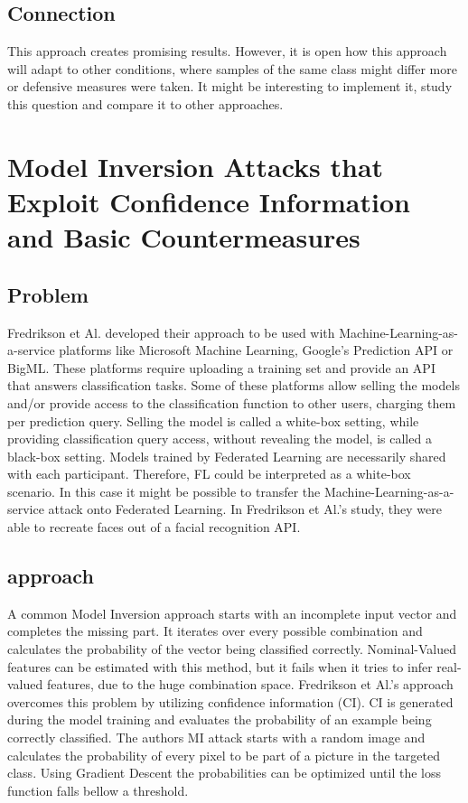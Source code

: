 \documentclass[
	ngerman,
	ruledheaders=section,%
	class=report,%
	thesis={type=bachelor},%
	accentcolor=1b,%
	custommargins=true,%
	marginpar=false,%
	parskip=half-,%
	fontsize=11pt,%
]{tudapub}
\begin{document}
\subsection{Connection}
This approach creates promising results. However, it is open how this approach will adapt to other conditions, where samples of the same class might differ more or defensive measures were taken. It might be interesting to implement it, study this question and compare it to other approaches.





\section{Model Inversion Attacks that Exploit Confidence Information and Basic Countermeasures}
\subsection{Problem}
Fredrikson et Al. \cite{fredrikson2015model} developed their approach to be used with Machine-Learning-as-a-service platforms like Microsoft Machine Learning, Google's Prediction API or BigML. These platforms require uploading a training set and provide an API that answers classification tasks. Some of these platforms allow selling the models and/or provide access to the classification function to other users, charging them per prediction query. Selling the model is called a white-box setting, while providing classification query access, without revealing the model, is called a black-box setting. Models trained by Federated Learning are necessarily shared with each participant. Therefore, FL could be interpreted as a white-box scenario. In this case it might be possible to transfer the Machine-Learning-as-a-service attack onto Federated Learning. In Fredrikson et Al.'s study, they were able to recreate faces out of a facial recognition API.
 
 \subsection{approach}
 A common Model Inversion approach starts with an incomplete input vector and completes the missing part. It iterates over every possible combination and calculates the probability of the vector being classified correctly. Nominal-Valued features can be estimated with this method, but it fails when it tries to infer real-valued features, due to the huge combination space. Fredrikson et Al.'s approach overcomes this problem by utilizing confidence information (CI). CI is generated during the model training and evaluates the probability of an example being correctly classified. The authors MI attack starts with a random image and calculates the probability of every pixel to be part of a picture in the targeted class. Using Gradient Descent the probabilities can be optimized until the loss function falls bellow a threshold.
 
\end{document}
